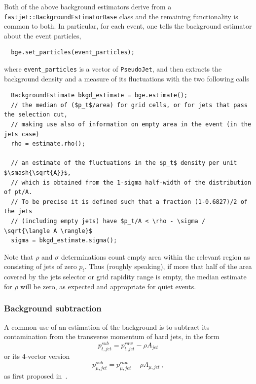 \documentclass[12pt,a4]{article}
\newcommand{\ttt}[1]{{\small\texttt{#1}}}
\newcommand{\PJ}{\ttt{PseudoJet}\xspace}
\begin{document}
Both of the above background estimators derive from a
\ttt{fastjet::BackgroundEstimatorBase} class and the remaining
functionality is common to both.
%
In particular, for each event, one tells the background estimator
about the event particles,
\begin{lstlisting}
  bge.set_particles(event_particles);
\end{lstlisting}
where \ttt{event\_particles} is a vector of \PJ, and then extracts the
background density and a measure of its fluctuations with the two
following calls 
%
\begin{lstlisting}
  BackgroundEstimate bkgd_estimate = bge.estimate();
  // the median of ($p_t$/area) for grid cells, or for jets that pass the selection cut, 
  // making use also of information on empty area in the event (in the jets case)
  rho = estimate.rho(); 

  // an estimate of the fluctuations in the $p_t$ density per unit $\smash{\sqrt{A}}$,
  // which is obtained from the 1-sigma half-width of the distribution of pt/A.
  // To be precise it is defined such that a fraction (1-0.6827)/2 of the jets
  // (including empty jets) have $p_t/A < \rho - \sigma / \sqrt{\langle A \rangle}$
  sigma = bkgd_estimate.sigma(); 
\end{lstlisting}
Note that $\rho$ and $\sigma$ determinations count empty area within
the relevant region as consisting of jets of zero $p_t$.
%
Thus (roughly speaking), if more that half of the area covered by the
jets selector or grid rapidity range is empty, the median estimate for
$\rho$ will be zero, as expected and appropriate for quiet events.


\subsubsection{Background subtraction}\label{sec:subtractor}

A common use of an estimation of the background is to subtract its contamination 
from the
transverse momentum of hard jets, in the form
\begin{equation}
  \label{eq:BGE-scalar-pt}
  p_{t,jet}^{sub} = p_{t,jet}^{raw} - \rho A_{jet} 
\end{equation}
or its 4-vector version
\begin{equation}
  \label{eq:BGE-4vector-massless}
  p_{\mu,jet}^{sub} = p_{\mu,jet}^{raw} - \rho A_{\mu,jet} \, ,
\end{equation}
as first proposed in~\cite{cs}.
\end{document}
